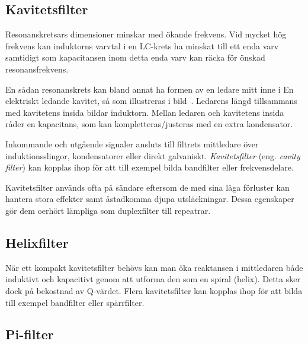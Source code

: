 \subsection{Kavitetsfilter}


Resonanskretsars dimensioner minskar med ökande frekvens.
Vid mycket hög frekvens kan induktorns varvtal i en LC-krets ha minskat till
ett enda varv samtidigt som kapacitansen inom detta enda varv kan räcka för
önskad resonansfrekvens.

En sådan resonanskrets kan bland annat ha formen av en ledare mitt inne i En
elektriskt ledande kavitet, så som illustreras i bild~.
Ledarens längd tillsammans med kavitetens insida bildar induktorn.
Mellan ledaren och kavitetens insida råder en kapacitans, som kan
kompletteras/justeras med en extra kondensator.

Inkommande och utgående signaler ansluts till filtrets mittledare över
induktionsslingor, kondensatorer eller direkt galvaniskt.
\emph{Kavitetsfilter} (eng. \emph{cavity filter}) kan kopplas ihop för att till
exempel bilda bandfilter eller frekvensdelare.

Kavitetsfilter används ofta på sändare eftersom de med sina låga förluster kan
hantera stora effekter samt åstadkomma djupa utsläckningar.
Dessa egenskaper gör dem oerhört lämpliga som duplexfilter till repeatrar.


\subsection{Helixfilter}

När ett kompakt kavitetsfilter behövs kan man öka reaktansen i mittledaren
både induktivt och kapacitivt genom att utforma den som en spiral (helix).
Detta sker dock på bekostnad av Q-värdet.
Flera kavitetsfilter kan kopplas ihop för att bilda till exempel bandfilter
eller spärrfilter.

\subsection{Pi-filter}


